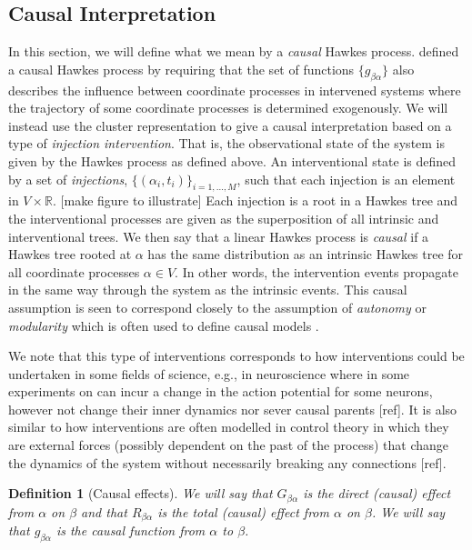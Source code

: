 \documentclass[accepted]{uai2021} %
\newtheorem{defn}[thm]{Definition}
\begin{document}

\subsection{Causal Interpretation}

In this section, we will define what we mean by a {\it causal} Hawkes process. 
\cite{mogensenUAI2020} defined a causal Hawkes process by requiring that the 
set 
of functions $\{g_{\beta\alpha}\}$ also describes the influence between 
coordinate processes in intervened systems where the trajectory of some 
coordinate processes is determined exogenously. We will instead use the cluster 
representation to give a causal
interpretation based on a type of \emph{injection intervention}. That is, the 
observational state of the system is given by the Hawkes process as defined 
above. An interventional state is defined by a set of \emph{injections}, 
$\{(\alpha_i, t_i) \}_{i =1,\ldots, M} $, such that each injection is an 
element in $V\times \mathbb{R}$. [make figure to illustrate] Each injection is 
a root in a Hawkes tree and the interventional processes are given as the 
superposition of all intrinsic and interventional trees. We then say that a 
linear Hawkes process is {\it 
causal} if a Hawkes tree rooted at $\alpha$ has the same distribution as an 
intrinsic Hawkes tree for all coordinate processes $\alpha \in V$. In 
other words, the intervention events 
propagate in the same way through the system as the intrinsic events. This 
causal assumption is seen to correspond closely to 
the assumption of \emph{autonomy} or \emph{modularity} which is often used to 
define causal models 
\citep{pearl2009, petersElements2017}.

We note that this type of interventions corresponds to how interventions could 
be undertaken in some fields of 
science, e.g., in neuroscience where in some experiments on can incur a change 
in the 
action potential for some neurons, however not change their inner dynamics nor 
sever causal parents [ref]. It is also similar to how interventions are often 
modelled in control theory in which they are external forces (possibly 
dependent on the past of the process) that change the dynamics of the system 
without necessarily breaking any connections [ref].

\begin{defn}[Causal effects]
	We will say that $G_{\beta\alpha}$ is the \emph{direct (causal) effect} 
	from 
	$\alpha$ on $\beta$ and that $R_{\beta\alpha}$ is the \emph{total (causal) 
	effect} from $\alpha$ on $\beta$. We will say that $g_{\beta\alpha}$ is the 
	{\it causal function} from $\alpha$ to $\beta$.
	\label{def:cauEff}
\end{defn}
\end{document}
